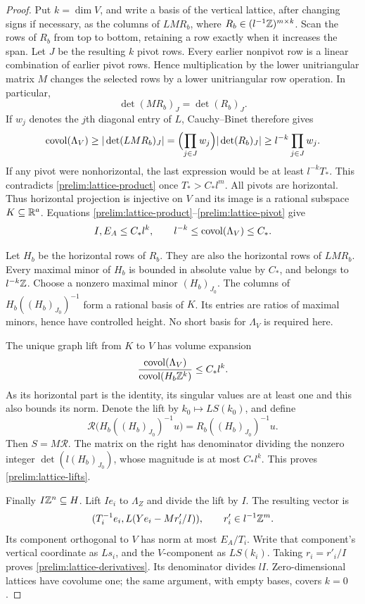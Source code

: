 \begin{proof}
Put $k=\dim V$, and write a basis of the vertical lattice, after
changing signs if necessary, as the columns of $LMR_b$, where
$R_b\in(l^{-1}\mathbb Z)^{m\times k}$.  Scan the rows of $R_b$ from
top to bottom, retaining a row exactly when it increases the span.
Let $J$ be the resulting $k$ pivot rows.  Every earlier nonpivot row
is a linear combination of earlier pivot rows.  Hence multiplication
by the lower unitriangular matrix $M$ changes the selected rows by
a lower unitriangular row operation.  In particular,
\[
 \det(MR_b)_J=\det(R_b)_J.
\]
If $w_j$ denotes the $j$th diagonal entry of $L$, Cauchy--Binet
therefore gives
\begin{equation}\label{prelim:lattice-pivot}
 \operatorname{covol}(\Lambda_V)\geq
 |\det(LMR_b)_J|
 =\Bigl(\prod_{j\in J}w_j\Bigr)|\det(R_b)_J|
 \geq l^{-k}\prod_{j\in J}w_j.
\end{equation}
If any pivot were nonhorizontal, the last expression would be at
least $l^{-k}T_*$.  This contradicts
\eqref{prelim:lattice-product} once $T_*>C_*l^m$.  All pivots are
horizontal.  Thus horizontal projection is injective on $V$ and
its image is a rational subspace $K\subseteq\mathbb R^a$.  Equations
\eqref{prelim:lattice-product}--\eqref{prelim:lattice-pivot} give
\[
 I,E_A\leq C_*l^k,\qquad
 l^{-k}\leq\operatorname{covol}(\Lambda_V)\leq C_*.
\]

Let $H_b$ be the horizontal rows of $R_b$.  They are also the
horizontal rows of $LMR_b$.  Every maximal minor of $H_b$ is
bounded in absolute value by $C_*$, and belongs to $l^{-k}\mathbb Z$.
Choose a nonzero maximal minor $(H_b)_{J_0}$.  The columns of
$H_b((H_b)_{J_0})^{-1}$ form a rational basis of $K$.  Its
entries are ratios of maximal minors, hence have controlled height.
No short basis for $\Lambda_V$ is required here.

The unique graph lift from $K$ to $V$ has volume expansion
\[
 \frac{\operatorname{covol}(\Lambda_V)}{\operatorname{covol}(H_b\mathbb Z^k)}
 \leq C_*l^k.
\]
As its horizontal part is the identity, its singular values are
at least one and this also bounds its norm.  Denote the lift by
$k_0\mapsto LS(k_0)$, and define
\[
 \mathcal R\bigl(H_b((H_b)_{J_0})^{-1}u\bigr)
 =R_b((H_b)_{J_0})^{-1}u.
\]
Then $S=M\mathcal R$.  The matrix on the right has denominator
dividing the nonzero integer $\det(l(H_b)_{J_0})$, whose magnitude
is at most $C_*l^k$.  This proves \eqref{prelim:lattice-lifts}.

Finally $I\mathbb Z^n\subseteq H$.  Lift $Ie_i$ to $\Lambda_Z$ and
divide the lift by $I$.  The resulting vector is
\[
 (T_i^{-1}e_i,L(Ye_i-Mr'_i/I)),\qquad
 r'_i\in l^{-1}\mathbb Z^m.
\]
Its component orthogonal to $V$ has norm at most $E_A/T_i$.
Write that component's vertical coordinate as $Ls_i$, and the
$V$-component as $LS(k_i)$.  Taking $r_i=r'_i/I$ proves
\eqref{prelim:lattice-derivatives}.  Its denominator divides $lI$.
Zero-dimensional lattices have covolume one; the same argument,
with empty bases, covers $k=0$.
\end{proof}



